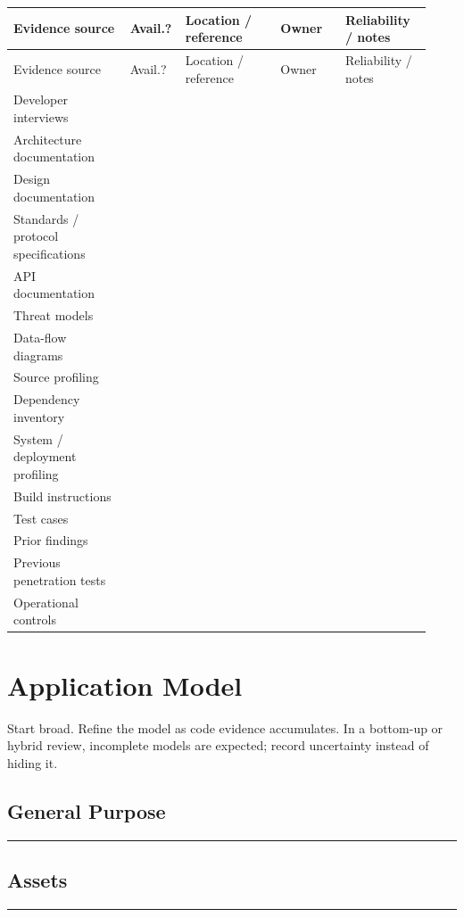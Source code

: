 \documentclass[10pt]{article}
\newcommand{\workarea}[1]{\par\smallskip\noindent\begin{tcolorbox}[height=#1,colback=white,colframe=linegray,boxrule=0.5pt,arc=0pt,left=2pt,right=2pt,top=2pt,bottom=2pt]\mbox{}\end{tcolorbox}\par}
\begin{document}
\begin{longtable}{@{}L{0.27\linewidth}C{0.09\linewidth}L{0.22\linewidth}L{0.15\linewidth}L{0.20\linewidth}@{}}
\toprule
Evidence source & Avail.? & Location / reference & Owner & Reliability / notes \\
\midrule
\endfirsthead
\toprule
Evidence source & Avail.? & Location / reference & Owner & Reliability / notes \\
\midrule
\endhead
Developer interviews & & & & \\
Architecture documentation & & & & \\
Design documentation & & & & \\
Standards / protocol specifications & & & & \\
API documentation & & & & \\
Threat models & & & & \\
Data-flow diagrams & & & & \\
Source profiling & & & & \\
Dependency inventory & & & & \\
System / deployment profiling & & & & \\
Build instructions & & & & \\
Test cases & & & & \\
Prior findings & & & & \\
Previous penetration tests & & & & \\
Operational controls & & & & \\
\bottomrule
\end{longtable}
\clearpage

\section{Application Model}
Start broad. Refine the model as code evidence accumulates. In a bottom-up or hybrid review, incomplete models are expected; record uncertainty instead of hiding it.

\subsection{General Purpose}
\rule{0.82\linewidth}{0.4pt}
\workarea{1.0in}

\subsection{Assets}
\rule{0.82\linewidth}{0.4pt}
\workarea{1.0in}
\end{document}
